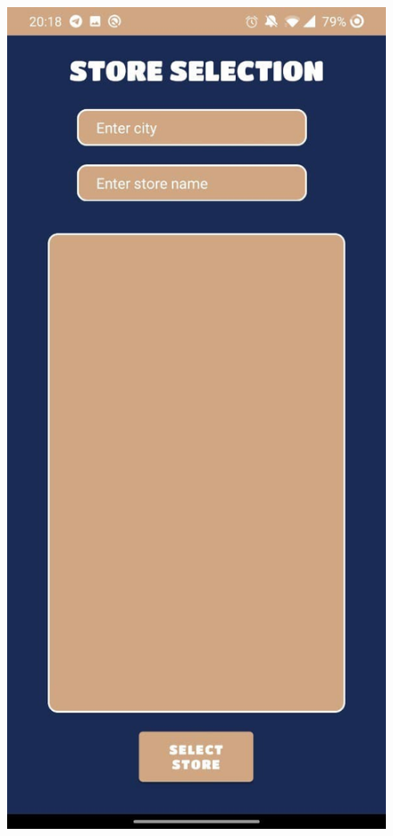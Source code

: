 \documentclass[table, 12pt]{article}
\begin{document}
\begin{figure}[!tbp]
    \centering
    \begin{minipage}[b]{0.4\textwidth}
        \includegraphics[width=\textwidth]{assets/screenshots/white_label_fix_jpg.jpg}

\end{minipage}
\end{figure}
\end{document}
